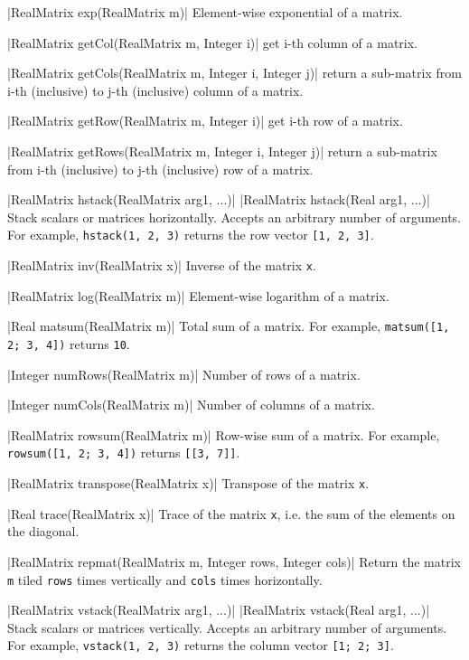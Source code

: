 \blog|RealMatrix exp(RealMatrix m)|
\myindent Element-wise exponential of a matrix.

\blog|RealMatrix getCol(RealMatrix m, Integer i)|
\myindent get i-th column of a matrix.

\blog|RealMatrix getCols(RealMatrix m, Integer i, Integer j)|
\myindent return a sub-matrix from i-th (inclusive) to j-th (inclusive) column of a matrix.

\blog|RealMatrix getRow(RealMatrix m, Integer i)|
\myindent get i-th row of a matrix.

\blog|RealMatrix getRows(RealMatrix m, Integer i, Integer j)|
\myindent return a sub-matrix from i-th (inclusive) to j-th (inclusive) row of a matrix.

\blog|RealMatrix hstack(RealMatrix arg1, ...)|
\blog|RealMatrix hstack(Real arg1, ...)|
\myindent Stack scalars or matrices horizontally. Accepts an arbitrary number
of arguments.
For example, \verb|hstack(1, 2, 3)| returns the row vector {\tt [1, 2, 3]}.

\blog|RealMatrix inv(RealMatrix x)|
\myindent Inverse of the matrix \verb|x|.

\blog|RealMatrix log(RealMatrix m)|
\myindent Element-wise logarithm of a matrix.

\blog|Real matsum(RealMatrix m)|
\myindent Total sum of a matrix.
For example, \verb|matsum([1, 2; 3, 4])| returns \verb|10|.

\blog|Integer numRows(RealMatrix m)|
\myindent Number of rows of a matrix.

\blog|Integer numCols(RealMatrix m)|
\myindent Number of columns of a matrix.

\blog|RealMatrix rowsum(RealMatrix m)|
\myindent Row-wise sum of a matrix.
For example, \verb|rowsum([1, 2; 3, 4])| returns \verb|[[3, 7]]|.

\blog|RealMatrix transpose(RealMatrix x)|
\myindent Transpose of the matrix \verb|x|.

\blog|Real trace(RealMatrix x)|
\myindent Trace of the matrix \verb|x|, i.e. the sum of the elements on the diagonal.

\blog|RealMatrix repmat(RealMatrix m, Integer rows, Integer cols)|
\myindent Return the matrix \verb|m| tiled \verb|rows| times vertically and
\verb|cols|
times horizontally.

\blog|RealMatrix vstack(RealMatrix arg1, ...)|
\blog|RealMatrix vstack(Real arg1, ...)|
\myindent Stack scalars or matrices vertically. Accepts an arbitrary number of
arguments.
For example, \verb|vstack(1, 2, 3)| returns the column vector {\tt [1; 2; 3]}.

